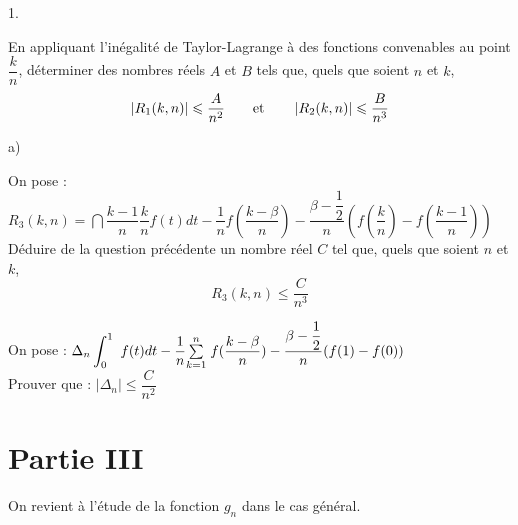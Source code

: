 \documentclass[11pt]{article}%
\begin{document}
\begin{noliste}{1.}
 \setlength{\itemsep}{4mm}
\item En appliquant l'inégalité de Taylor-Lagrange à des fonctions
convenables au point $\dfrac{k}{n}$, déterminer des nombres réels $A$
et $B$
tels que, quels que soient $n$ et $k$,
\[
\left| R_{1}(k,n)\right| \leq \dfrac{A}{n^{2}}\qquad \text{et\qquad
}\left| R_{2}(k,n)\right| \leq \dfrac{B}{n^{3}}
\]

\item 

\begin{noliste}{a)}
 \setlength{\itemsep}{2mm}
\item On pose : $R_{3}(k,n) =
\dint{\dfrac{k-1}{n}}{\dfrac{k}{n}}f(t)dt-\dfrac{1}{n}f(\dfrac{k-\beta
}{n})-\dfrac{\beta
-\dfrac{1}{2}}{n}(f(\dfrac{k}{n})-f(\dfrac{k-1}{n}))$\\
Déduire de la question précédente un nombre réel $C$ tel que, quels que
soient $n$ et $k$,
\[
R_{3}(k,n)\leq \dfrac{C}{n^{3}}
\]

\item On pose : $\Delta_{n}\dint{0}{1}f(t)dt-\dfrac{1}{n}\Sum{k =
1}{n}f(\dfrac{k-\beta }{n})-\dfrac{\beta
-\dfrac{1}{2}}{n}(f(1)-f(0))$\\
Prouver que : $\left| \Delta_{n}\right| \leq \dfrac{C}{n^{2}}$
\end{noliste}
\end{noliste}

\section*{Partie III}

On revient à l'étude de la fonction $g_{n}$ dans le cas général.
\end{document}
